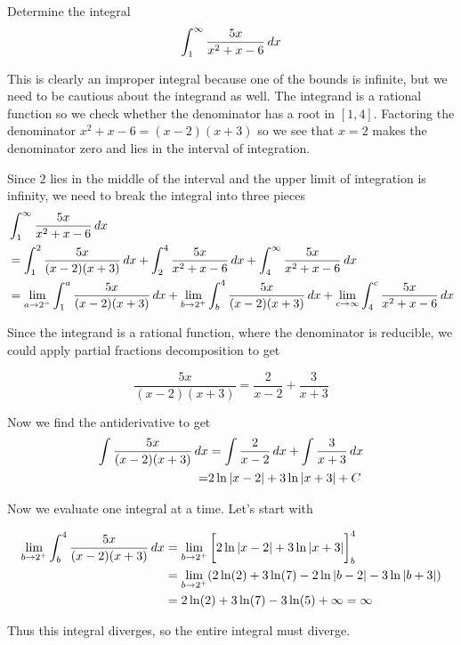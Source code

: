 \documentclass{ximera}
\begin{document}
\begin{example}
Determine the integral
\[
\int_{1}^{\infty} \frac{5x}{x^{2}+x-6} \mathop{}\!d x 
\]


\begin{explanation}
This is clearly an improper integral because one of the bounds is infinite, but we need to be cautious about the integrand as well. The integrand is a rational function so we check whether the denominator has a root in $[1,4]$. 
Factoring the denominator $x^{2}+x-6=(x-2)(x+3)$ so we see that $x=2$ makes the denominator zero 
and lies in the interval of integration. 

Since $2$ lies in the middle of the interval and the upper limit of integration is infinity, we need to break the integral into three pieces
\begin{align*}
& \int_{1}^{\infty} \frac{5x}{x^{2}+x-6} \mathop{}\!d x \\
&= \int_{1}^{2} \frac{5x}{(x-2)(x+3)} \mathop{}\!d x  + \int_{2}^{4} \frac{5x}{x^{2}+x-6} \mathop{}\!d x + \int_{4}^{\infty} \frac{5x}{x^{2}+x-6} \mathop{}\!d x\\
      &=\lim_{a \to 2^{-}} \int_{1}^a \frac{5x}{(x-2)(x+3)} \mathop{}\!d x + \lim_{b \to 2^{+}} \int_{b}^{4} \frac{5x}{(x-2)(x+3)} \mathop{}\!d x +\lim_{c \to \infty} \int_{4}^{c} \frac{5x}{x^{2}+x-6} \mathop{}\!d x
\end{align*}

Since the integrand is a rational function, where the denominator is reducible, we could apply partial fractions decomposition to get

\[
\frac{5x}{(x-2)(x+3)}=\frac{ 2}{x-2} +\frac{ 3}{x+3}
\]


Now we find the antiderivative to get 
\begin{align*}
\int \frac{5x}{(x-2)(x+3)} \mathop{}\!d x&=\int \frac{ 2}{x-2} \mathop{}\!d x + \int \frac{ 3}{x+3} \mathop{}\!d x \\
=& 2\ln|x-2| + 3\ln|x+3 | + C
\end{align*}


Now we evaluate one integral at a time.  Let's start with

\begin{align*}
\lim_{b \to 2^{+}} \int_{b}^{4} \frac{5x}{(x-2)(x+3)} \mathop{}\!d x&= \lim_{b \to 2^{+}} \bigg[  2\ln|x-2| + 3\ln|x+3 |  \bigg]_{b}^{4} \\
&=\lim_{b \to 2^{+}} (2\ln(2) + 3 \ln(7) - 2\ln|b-2| -3\ln|b+3| ) \\
&=2\ln(2) +3\ln(7)-3\ln(5) + \infty=\infty
\end{align*}

Thus this integral diverges, so the entire integral must diverge. 

\end{explanation}
\end{example}
\end{document}
